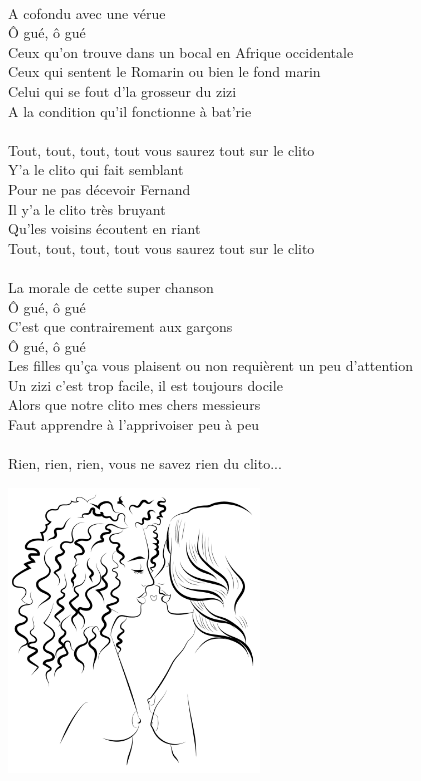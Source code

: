 \\A cofondu avec une vérue 
\\Ô gué, ô gué
\\Ceux qu'on trouve dans un bocal en Afrique occidentale
\\Ceux qui sentent le Romarin ou bien le fond marin
\\Celui qui se fout d'la grosseur du zizi
\\A la condition qu'il fonctionne à bat'rie
\\\\Tout, tout, tout, tout vous saurez tout sur le clito
\\Y'a le clito qui fait semblant
\\Pour ne pas décevoir Fernand
\\Il y'a le clito très bruyant
\\Qu'les voisins écoutent en riant
\\Tout, tout, tout, tout vous saurez tout sur le clito
\\\\La morale de cette super chanson 
\\Ô gué, ô gué
\\C'est que contrairement aux garçons 
\\Ô gué, ô gué
\\Les filles qu'ça vous plaisent ou non requièrent un peu
d'attention
\\Un zizi c'est trop facile, il est toujours docile
\\Alors que notre clito mes chers messieurs
\\Faut apprendre à l'apprivoiser peu à peu
\\\\Rien, rien, rien, vous ne savez rien du clito...
\\
\begin{center}
   \includegraphics[width=0.5\textwidth]{images/brev70.png}
\end{center}

\breakpage